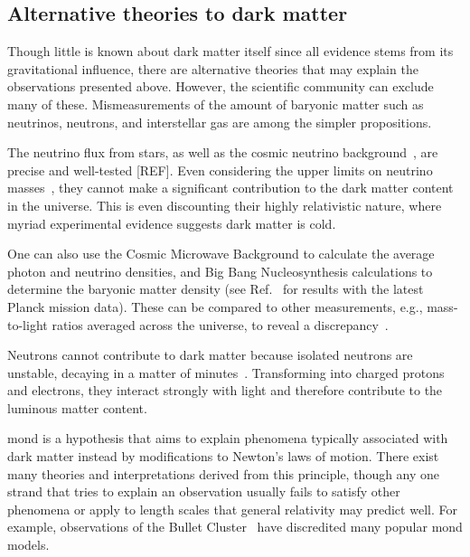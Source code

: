

\subsection{Alternative theories to dark matter}
\label{subsec:intro_alternative_dm_theories}

Though little is known about dark matter itself since all evidence stems from its gravitational influence, there are alternative theories that may explain the observations presented above. However, the scientific community can exclude many of these. Mismeasurements of the amount of baryonic matter such as neutrinos, neutrons, and interstellar gas are among the simpler propositions.

The neutrino flux from stars, as well as the cosmic neutrino background~\cite{weinberg2008cosmology}, are precise and well-tested [REF]. Even considering the upper limits on neutrino masses~\cite{1742-6596-718-2-022013}, they cannot make a significant contribution to the dark matter content in the universe. This is even discounting their highly relativistic nature, where myriad experimental evidence suggests dark matter is cold.

One can also use the Cosmic Microwave Background to calculate the average photon and neutrino densities, and Big Bang Nucleosynthesis calculations to determine the baryonic matter density (see Ref.~ for results with the latest Planck mission data). These can be compared to other measurements, e.g., mass-to-light ratios averaged across the universe, to reveal a discrepancy~\cite{cox2016universal}.

Neutrons cannot contribute to dark matter because isolated neutrons are unstable, decaying in a matter of minutes~\cite{PDGbooklet2010}. Transforming into charged protons and electrons, they interact strongly with light and therefore contribute to the luminous matter content.

\Gls{mond} is a hypothesis that aims to explain phenomena typically associated with dark matter instead by modifications to Newton's laws of motion. There exist many theories and interpretations derived from this principle, though any one strand that tries to explain an observation usually fails to satisfy other phenomena or apply to length scales that general relativity may predict well. For example, observations of the Bullet Cluster~\cite{BulletClusterDMevidence} have discredited many popular \acrshort{mond} models.


